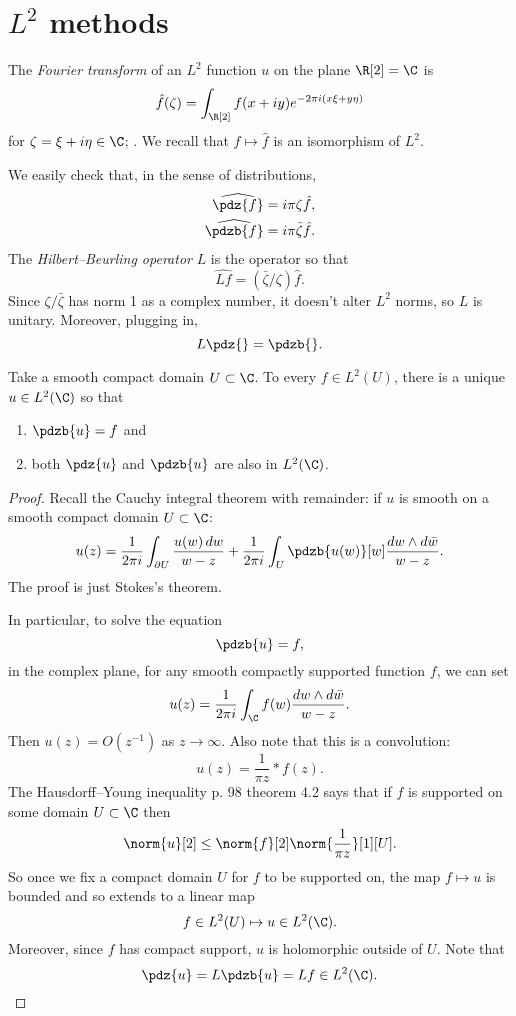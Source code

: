\section{\texorpdfstring{\(L^2\) methods}{L2 methods}}
The \emph{Fourier transform} of an \(L^2\) function \(u\) on the plane \(\R[2]=\C\) is
\[
\hat{f}(\zeta)
=
\int_{\R[2]} f(x+iy) e^{-2 \pi i (x\xi + y \eta)}
\]
for \(\zeta = \xi + i \eta \in \C\); \cite{Folland:1992}. 
We recall that \(f \mapsto \hat{f}\) is an isomorphism of \(L^2\).

We easily check that, in the sense of distributions, 
\begin{align*}
\widehat{\pdz{f}} &= i \pi \zeta \hat{f}, \\
\widehat{\pdzb{f}} &= i \pi \bar\zeta \hat{f}.
\end{align*}
The \emph{Hilbert--Beurling operator} \(L\) is the operator so that
\[
\widehat{Lf}=(\bar\zeta/\zeta)\hat{f}.
\]
Since \(\zeta/\bar{\zeta}\) has norm 1 as a complex number, it doesn't alter \(L^2\) norms, so \(L\) is unitary.
Moreover, plugging in,
\[
L\pdz{} = \pdzb{}.
\]

\begin{theorem}
Take a smooth compact domain \(U \subset \C\).
To every \(f \in L^2(U)\), there is a unique \(u \in L^2(\C)\) so that 
\begin{enumerate}
\item \(\pdzb{u}=f\) and
\item both \(\pdz{u}\) and \(\pdzb{u}\) are also in \(L^2(\C)\).
\end{enumerate}
\end{theorem}
\begin{proof}
Recall the Cauchy integral theorem with remainder: if \(u\) is smooth on a smooth compact domain \(U \subset \C\):
\[
u(z) = \frac{1}{2 \pi i} \int_{\partial U} \frac{u(w) \, dw}{w-z} + \frac{1}{2 \pi i} \int_U \pdzb{u(w)}[w] \frac{dw \wedge d\bar{w}}{w-z}.
\]
The proof is just Stokes's theorem.

In particular, to solve the equation
\[
\pdzb{u} = f,
\]
in the complex plane, for any smooth compactly supported function \(f\), we can set
\[
u(z) = \frac{1}{2 \pi i} \int_{\C} f(w) \frac{dw \wedge d\bar{w}}{w-z}.
\]
Then \(u(z)=O(z^{-1})\) as \(z \to \infty\).
Also note that this is a convolution:
\[
u(z) = \frac{1}{\pi z} * f(z).
\]
The Hausdorff--Young inequality \cite{Lieb/Loss:2001} p. 98 theorem 4.2 says that if \(f\) is supported on some domain \(U \subset \C\) then
\[
\norm{u}[2] \le \norm{f}[2] \norm{\frac{1}{\pi z}}[1][U].
\]
So once we fix a compact domain \(U\) for \(f\) to be supported on, the map \(f \mapsto u\) is bounded and so extends to a linear map
\[
f \in L^2(U) \mapsto u \in L^2(\C).
\]
Moreover, since \(f\) has compact support, \(u\) is holomorphic outside of \(U\).
Note that
\[
\pdz{u} = L \pdzb{u} = Lf \in L^2(\C).
\]
\end{proof}

